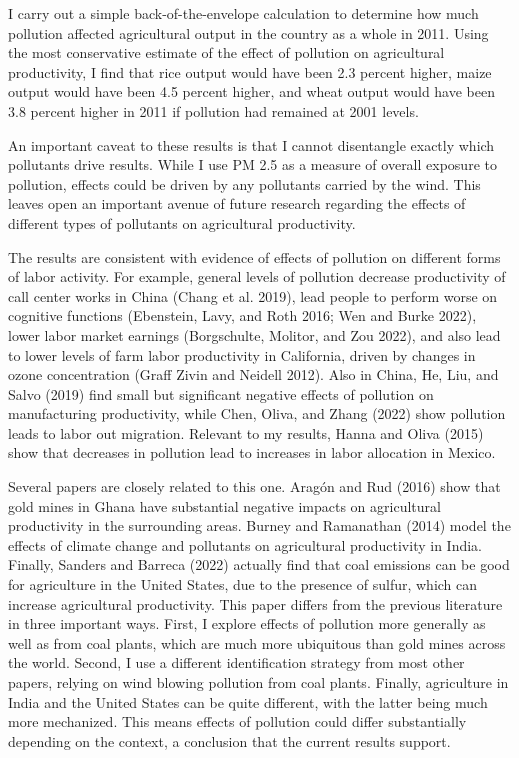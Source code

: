 \documentclass[
]{article}
\begin{document}
I carry out a simple back-of-the-envelope calculation to determine how much pollution affected agricultural output in the country as a whole in 2011. Using the most conservative estimate of the effect of pollution on agricultural productivity, I find that rice output would have been 2.3 percent higher, maize output would have been 4.5 percent higher, and wheat output would have been 3.8 percent higher in 2011 if pollution had remained at 2001 levels.

An important caveat to these results is that I cannot disentangle exactly which pollutants drive results. While I use PM 2.5 as a measure of overall exposure to pollution, effects could be driven by any pollutants carried by the wind. This leaves open an important avenue of future research regarding the effects of different types of pollutants on agricultural productivity.

The results are consistent with evidence of effects of pollution on different forms of labor activity. For example, general levels of pollution decrease productivity of call center works in China (Chang et al. 2019), lead people to perform worse on cognitive functions (Ebenstein, Lavy, and Roth 2016; Wen and Burke 2022), lower labor market earnings (Borgschulte, Molitor, and Zou 2022), and also lead to lower levels of farm labor productivity in California, driven by changes in ozone concentration (Graff Zivin and Neidell 2012). Also in China, He, Liu, and Salvo (2019) find small but significant negative effects of pollution on manufacturing productivity, while Chen, Oliva, and Zhang (2022) show pollution leads to labor out migration. Relevant to my results, Hanna and Oliva (2015) show that decreases in pollution lead to increases in labor allocation in Mexico.

Several papers are closely related to this one. Aragón and Rud (2016) show that gold mines in Ghana have substantial negative impacts on agricultural productivity in the surrounding areas. Burney and Ramanathan (2014) model the effects of climate change and pollutants on agricultural productivity in India. Finally, Sanders and Barreca (2022) actually find that coal emissions can be good for agriculture in the United States, due to the presence of sulfur, which can increase agricultural productivity. This paper differs from the previous literature in three important ways. First, I explore effects of pollution more generally as well as from coal plants, which are much more ubiquitous than gold mines across the world. Second, I use a different identification strategy from most other papers, relying on wind blowing pollution from coal plants. Finally, agriculture in India and the United States can be quite different, with the latter being much more mechanized. This means effects of pollution could differ substantially depending on the context, a conclusion that the current results support.
\end{document}
